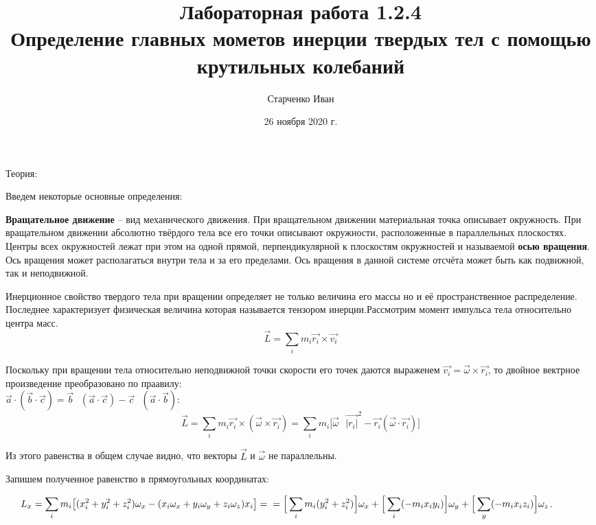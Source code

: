 \documentclass[12pt,a5paper,fleqn]{article}
\author{Старченко Иван}
\title{Лабораторная работа 1.2.4\\ Определение главных мометов инерции твердых тел с помощью крутильных колебаний }
\date{26 ноября 2020 г.}
\begin{document}
\maketitle
\newpage

\begin{center}
\begin{LARGE}
Теория:
\end{LARGE}
\end{center}

Введем некоторые основные определения:

 \textbf{Вращательное движение} -- вид механического движения. При вращательном движении материальная точка описывает окружность. При вращательном движении абсолютно твёрдого тела все его точки описывают окружности, расположенные в параллельных плоскостях. Центры всех окружностей лежат при этом на одной прямой, перпендикулярной к плоскостям окружностей и называемой \textbf{осью вращения}. Ось вращения может располагаться внутри тела и за его пределами. Ось вращения в данной системе отсчёта может быть как подвижной, так и неподвижной.
 
Инерционное свойство твердого тела при вращении определяет не только величина его массы но и её пространственное распределение. Последнее характеризует физическая величина которая называется тензором инерции.Рассмотрим момент импульса тела относительно центра масс.\\
\[\vec{L}=\displaystyle\sum_im_i\vec{r_i}\times\vec{v_i}\]

Поскольку при вращении тела относительно неподвижной точки скорости его точек даются выраженем $\vec{v_i} = \vec{\omega}\times \vec{r_i}$, то двойное вектрное произведение преобразовано по праавилу: \\
${\vec{a}} \cdot ({\vec{b}} \cdot {\vec{c}}) = \vec{b}\mbox{ } (\vec{a}\cdot \vec{c}) - \vec{c}\mbox{ } ({\vec{a}} \cdot {\vec{b}})$:\\
\[\vec{L}=\displaystyle\sum_i m_i\vec{r_i}\times(\vec{\omega}\times \vec{r_i}) = \sum_i m_i \big[ \vec{\omega}\mbox{ } \vec{|r_i|}^2 - \vec{r_i} (\vec{\omega}\cdot \vec{r_i})\big]\]

	Из этого равенства в общем случае видно, что векторы $\vec{L}$ и $\vec{\omega}$ не параллельны.
	
	Запишем полученное равенство в прямоугольных координатах:
	
\mbox{ }\mbox{ }\mbox{ }$L_x = \displaystyle \sum_i m_i\big[(x_i^2+y_i^2+z_i^2)\omega_x - (x_i\omega_x+y_i\omega_y+z_i\omega_z)x_i\big] =  \\ = \Big[ \sum_i m_i (y_i^2+z_i^2)\Big]\omega_x + \Big[ \sum_i(-m_ix_iy_i) \Big]\omega_y + \Big[\sum_y(-m_ix_iz_i)\Big]\omega_z $.
\end{document}
